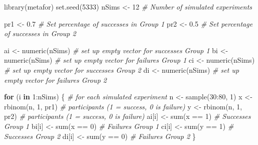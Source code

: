 \documentclass[
  oneside]{krantz}
\makeatletter
\newenvironment{Shaded}{\begin{snugshade}}{\end{snugshade}}
\newcommand{\CommentTok}[1]{\textcolor[rgb]{0.37,0.37,0.37}{\textit{#1}}}
\newcommand{\ControlFlowTok}[1]{\textcolor[rgb]{0.27,0.27,0.27}{\textbf{#1}}}
\newcommand{\DecValTok}[1]{\textcolor[rgb]{0.06,0.06,0.06}{#1}}
\newcommand{\FloatTok}[1]{\textcolor[rgb]{0.06,0.06,0.06}{#1}}
\newcommand{\FunctionTok}[1]{\textcolor[rgb]{0,0,0}{#1}}
\newcommand{\NormalTok}[1]{#1}
\newcommand{\OtherTok}[1]{\textcolor[rgb]{0.37,0.37,0.37}{#1}}
\newcommand{\SpecialCharTok}[1]{\textcolor[rgb]{0,0,0}{#1}}
\newenvironment{kframe}{%
\medskip{}
\setlength{\fboxsep}{.8em}
 \def\at@end@of@kframe{}%
 \ifinner\ifhmode%
  \def\at@end@of@kframe{\end{minipage}}%
  \begin{minipage}{\columnwidth}%
 \fi\fi%
 \def\FrameCommand##1{\hskip\@totalleftmargin \hskip-\fboxsep
 \colorbox{shadecolor}{##1}\hskip-\fboxsep
     \hskip-\linewidth \hskip-\@totalleftmargin \hskip\columnwidth}%
 \MakeFramed {\advance\hsize-\width
   \@totalleftmargin\z@ \linewidth\hsize
   \@setminipage}}%
 {\par\unskip\endMakeFramed%
 \at@end@of@kframe}
\renewenvironment{Shaded}{\begin{kframe}}{\end{kframe}}
\makeatother
\begin{document}
\begin{Shaded}
\begin{Highlighting}[]
\FunctionTok{library}\NormalTok{(metafor)}
\FunctionTok{set.seed}\NormalTok{(}\DecValTok{5333}\NormalTok{)}
\NormalTok{nSims }\OtherTok{\textless{}{-}} \DecValTok{12} \CommentTok{\# Number of simulated experiments}

\NormalTok{pr1 }\OtherTok{\textless{}{-}} \FloatTok{0.7} \CommentTok{\# Set percentage of successes in Group 1}
\NormalTok{pr2 }\OtherTok{\textless{}{-}} \FloatTok{0.5} \CommentTok{\# Set percentage of successes in Group 2}

\NormalTok{ai }\OtherTok{\textless{}{-}} \FunctionTok{numeric}\NormalTok{(nSims) }\CommentTok{\# set up empty vector for successes Group 1}
\NormalTok{bi }\OtherTok{\textless{}{-}} \FunctionTok{numeric}\NormalTok{(nSims) }\CommentTok{\# set up empty vector for failures Group 1}
\NormalTok{ci }\OtherTok{\textless{}{-}} \FunctionTok{numeric}\NormalTok{(nSims) }\CommentTok{\# set up empty vector for successes Group 2}
\NormalTok{di }\OtherTok{\textless{}{-}} \FunctionTok{numeric}\NormalTok{(nSims) }\CommentTok{\# set up empty vector for failures Group 2}

\ControlFlowTok{for}\NormalTok{ (i }\ControlFlowTok{in} \DecValTok{1}\SpecialCharTok{:}\NormalTok{nSims) \{ }\CommentTok{\# for each simulated experiment}
\NormalTok{  n }\OtherTok{\textless{}{-}} \FunctionTok{sample}\NormalTok{(}\DecValTok{30}\SpecialCharTok{:}\DecValTok{80}\NormalTok{, }\DecValTok{1}\NormalTok{)}
\NormalTok{  x }\OtherTok{\textless{}{-}} \FunctionTok{rbinom}\NormalTok{(n, }\DecValTok{1}\NormalTok{, pr1) }\CommentTok{\# participants (1 = success, 0 is failure)}
\NormalTok{  y }\OtherTok{\textless{}{-}} \FunctionTok{rbinom}\NormalTok{(n, }\DecValTok{1}\NormalTok{, pr2) }\CommentTok{\# participants (1 = success, 0 is failure)}
\NormalTok{  ai[i] }\OtherTok{\textless{}{-}} \FunctionTok{sum}\NormalTok{(x }\SpecialCharTok{==} \DecValTok{1}\NormalTok{) }\CommentTok{\# Successes Group 1}
\NormalTok{  bi[i] }\OtherTok{\textless{}{-}} \FunctionTok{sum}\NormalTok{(x }\SpecialCharTok{==} \DecValTok{0}\NormalTok{) }\CommentTok{\# Failures Group 1}
\NormalTok{  ci[i] }\OtherTok{\textless{}{-}} \FunctionTok{sum}\NormalTok{(y }\SpecialCharTok{==} \DecValTok{1}\NormalTok{) }\CommentTok{\# Successes Group 2}
\NormalTok{  di[i] }\OtherTok{\textless{}{-}} \FunctionTok{sum}\NormalTok{(y }\SpecialCharTok{==} \DecValTok{0}\NormalTok{) }\CommentTok{\# Failures Group 2}
\NormalTok{\}}


\end{Highlighting}
\end{Shaded}
\end{document}
